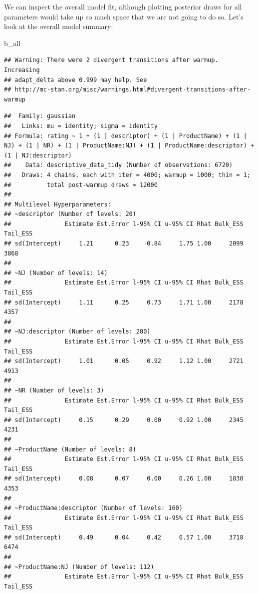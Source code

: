 \documentclass[
]{book}
\newenvironment{Shaded}{\begin{snugshade}}{\end{snugshade}}
\newcommand{\NormalTok}[1]{#1}
\begin{document}
We can inspect the overall model fit, although plotting posterior draws for all parameters would take up so much space that we are not going to do so. Let's look at the overall model summary:

\begin{Shaded}
\begin{Highlighting}[]
\NormalTok{b\_all}
\end{Highlighting}
\end{Shaded}

\begin{verbatim}
## Warning: There were 2 divergent transitions after warmup. Increasing
## adapt_delta above 0.999 may help. See
## http://mc-stan.org/misc/warnings.html#divergent-transitions-after-warmup
\end{verbatim}

\begin{verbatim}
##  Family: gaussian 
##   Links: mu = identity; sigma = identity 
## Formula: rating ~ 1 + (1 | descriptor) + (1 | ProductName) + (1 | NJ) + (1 | NR) + (1 | ProductName:NJ) + (1 | ProductName:descriptor) + (1 | NJ:descriptor) 
##    Data: descriptive_data_tidy (Number of observations: 6720) 
##   Draws: 4 chains, each with iter = 4000; warmup = 1000; thin = 1;
##          total post-warmup draws = 12000
## 
## Multilevel Hyperparameters:
## ~descriptor (Number of levels: 20) 
##               Estimate Est.Error l-95% CI u-95% CI Rhat Bulk_ESS Tail_ESS
## sd(Intercept)     1.21      0.23     0.84     1.75 1.00     2099     3868
## 
## ~NJ (Number of levels: 14) 
##               Estimate Est.Error l-95% CI u-95% CI Rhat Bulk_ESS Tail_ESS
## sd(Intercept)     1.11      0.25     0.73     1.71 1.00     2178     4357
## 
## ~NJ:descriptor (Number of levels: 280) 
##               Estimate Est.Error l-95% CI u-95% CI Rhat Bulk_ESS Tail_ESS
## sd(Intercept)     1.01      0.05     0.92     1.12 1.00     2721     4913
## 
## ~NR (Number of levels: 3) 
##               Estimate Est.Error l-95% CI u-95% CI Rhat Bulk_ESS Tail_ESS
## sd(Intercept)     0.15      0.29     0.00     0.92 1.00     2345     4231
## 
## ~ProductName (Number of levels: 8) 
##               Estimate Est.Error l-95% CI u-95% CI Rhat Bulk_ESS Tail_ESS
## sd(Intercept)     0.08      0.07     0.00     0.26 1.00     1830     4353
## 
## ~ProductName:descriptor (Number of levels: 160) 
##               Estimate Est.Error l-95% CI u-95% CI Rhat Bulk_ESS Tail_ESS
## sd(Intercept)     0.49      0.04     0.42     0.57 1.00     3718     6474
## 
## ~ProductName:NJ (Number of levels: 112) 
##               Estimate Est.Error l-95% CI u-95% CI Rhat Bulk_ESS Tail_ESS

\end{verbatim}
\end{document}
